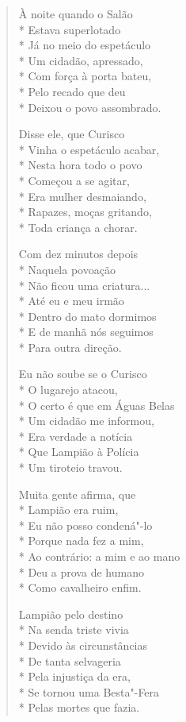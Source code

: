 \begin{verse}
À noite quando o Salão\\*
Estava superlotado\\*
Já no meio do espetáculo\\*
Um cidadão, apressado,\\*
Com força à porta bateu,\\*
Pelo recado que deu\\*
Deixou o povo assombrado.

Disse ele, que Curisco\\*
Vinha o espetáculo acabar,\\*
Nesta hora todo o povo\\*
Começou a se agitar,\\*
Era mulher desmaiando,\\*
Rapazes, moças gritando,\\*
Toda criança a chorar.

Com dez minutos depois\\*
Naquela povoação\\*
Não ficou uma criatura...\\*
Até eu e meu irmão\\*
Dentro do mato dormimos\\*
E de manhã nós seguimos\\*
Para outra direção.

Eu não soube se o Curisco\\*
O lugarejo atacou,\\*
O certo é que em Águas Belas\\*
Um cidadão me informou,\\*
Era verdade a notícia\\*
Que Lampião à Polícia\\*
Um tiroteio travou.

Muita gente afirma, que\\*
Lampião era ruim,\\*
Eu não posso condená"-lo\\*
Porque nada fez a mim,\\*
Ao contrário: a mim e ao mano\\*
Deu a prova de humano\\*
Como cavalheiro enfim.

Lampião pelo destino\\*
Na senda triste vivia\\*
Devido às circunstâncias\\*
De tanta selvageria\\*
Pela injustiça da era,\\*
Se tornou uma Besta"-Fera\\*
Pelas mortes que fazia.


\end{verse}
